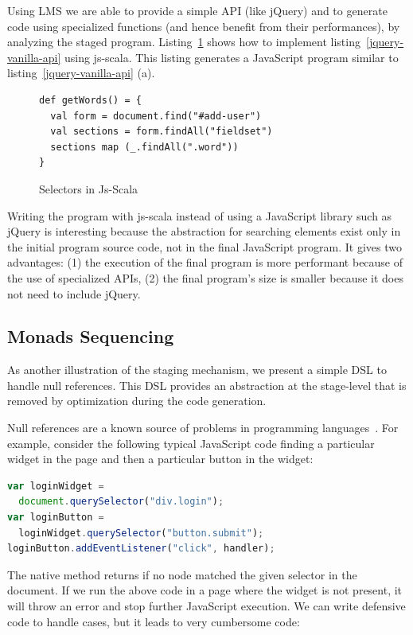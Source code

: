 \documentclass[preprint]{sigplanconf}
\begin{document}
Using LMS we are able to provide a simple API (like jQuery) and to generate code using specialized functions (and
hence benefit from their performances), by analyzing the staged program. Listing~\ref{js-scala-selectors} shows how
to implement listing~\ref{jquery-vanilla-api} using js-scala. This listing generates a JavaScript program similar to
listing~\ref{jquery-vanilla-api} (a).

\begin{figure}
\label{js-scala-selectors}
\begin{lstlisting}
def getWords() = {
  val form = document.find("#add-user")
  val sections = form.findAll("fieldset")
  sections map (_.findAll(".word"))
}
\end{lstlisting}
\caption{Selectors in Js-Scala}
\end{figure}

Writing the program with js-scala instead of using a JavaScript library such as jQuery is interesting because the
abstraction for searching elements exist only in the initial program source code, not in the final JavaScript
program. It gives two advantages: (1) the execution of the final program is more performant because of the use of
specialized APIs, (2) the final program’s size is smaller because it does not need to include jQuery.

\subsection{Monads Sequencing}

As another illustration of the staging mechanism, we present a simple DSL to handle null references. This DSL
provides an abstraction at the stage-level that is removed by optimization during the code generation.

Null references are a known source of problems in programming languages~\cite{Hoare09_Null,Nanda09_Null}. For
example, consider the following typical JavaScript code finding a particular widget in the page and then a particular
button in the widget:

\begin{lstlisting}[language=JavaScript,label=null-unsafe,caption=Unsafe code]
var loginWidget =
  document.querySelector("div.login");
var loginButton =
  loginWidget.querySelector("button.submit");
loginButton.addEventListener("click", handler);
\end{lstlisting}

The native  method returns  if no node matched the given selector in the document. If
we run the above code in a page where the widget is not present, it will throw an error and stop further JavaScript
execution. We can write defensive code to handle  cases, but it leads to very cumbersome code:
\end{document}
